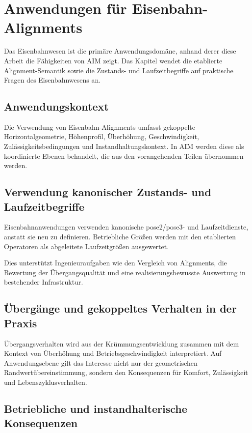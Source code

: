 
\chapter{Anwendungen für Eisenbahn-Alignments}
\label{chap:applications-railway}

Das Eisenbahnwesen ist die primäre Anwendungsdomäne, anhand derer diese
Arbeit die Fähigkeiten von AIM zeigt. Das Kapitel wendet die etablierte
Alignment-Semantik sowie die Zustands- und Laufzeitbegriffe auf praktische
Fragen des Eisenbahnwesens an.

\section{Anwendungskontext}

Die Verwendung von Eisenbahn-Alignments umfasst gekoppelte
Horizontalgeometrie, Höhenprofil, Überhöhung, Geschwindigkeit,
Zulässigkeitsbedingungen und Instandhaltungskontext. In AIM werden diese
als koordinierte Ebenen behandelt, die aus den vorangehenden Teilen
übernommen werden.

\section{Verwendung kanonischer Zustands- und Laufzeitbegriffe}

Eisenbahnanwendungen verwenden kanonische pose2/pose3- und Laufzeitdienste,
anstatt sie neu zu definieren. Betriebliche Größen werden mit den
etablierten Operatoren als abgeleitete Laufzeitgrößen ausgewertet.

Dies unterstützt Ingenieuraufgaben wie den Vergleich von Alignments, die
Bewertung der Übergangsqualität und eine realisierungsbewusste Auswertung
in bestehender Infrastruktur.

\section{Übergänge und gekoppeltes Verhalten in der Praxis}

Übergangsverhalten wird aus der Krümmungsentwicklung zusammen mit dem
Kontext von Überhöhung und Betriebsgeschwindigkeit interpretiert. Auf
Anwendungsebene gilt das Interesse nicht nur der geometrischen
Randwertübereinstimmung, sondern den Konsequenzen für Komfort,
Zulässigkeit und Lebenszyklusverhalten.

\section{Betriebliche und instandhalterische Konsequenzen}

